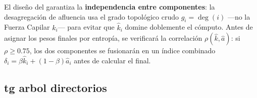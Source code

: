 El diseño del  garantiza la \textbf{independencia entre
componentes}: la desagregación de afluencia usa el grado topológico crudo
$g_i = \deg(i)$ —no la Fuerza Capilar $k_i$— para evitar que $\hat{k}_i$
domine doblemente el cómputo. Antes de asignar los pesos finales por entropía,
se verificará la correlación $\rho(\hat{k}, \hat{a})$: si $\rho \geq 0.75$,
los dos componentes se fusionarán en un índice combinado $\delta_i = \beta
\hat{k}_i + (1-\beta)\hat{a}_i$ antes de calcular el  final.

\subsection*{tg arbol directorios}
\DIFaddbegin 
 \DIFaddend

